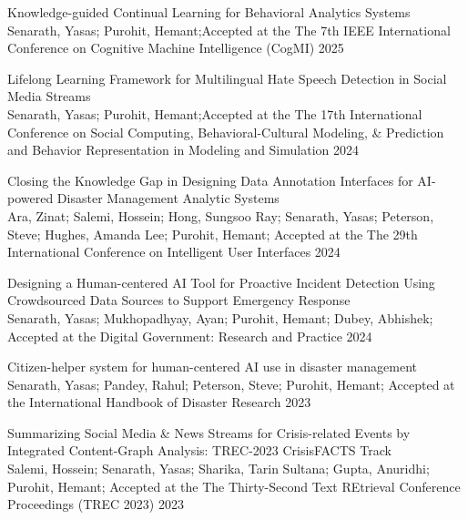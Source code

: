 \begin{rSubsection}{ Knowledge-guided Continual Learning for Behavioral  Analytics Systems }{\\ Senarath, Yasas; Purohit, Hemant;}{Accepted at the The 7th IEEE International Conference on Cognitive Machine Intelligence (CogMI)}{ 2025 }
\end{rSubsection}

\begin{rSubsection}{ Lifelong Learning Framework for Multilingual Hate Speech Detection in Social Media Streams }{\\ Senarath, Yasas; Purohit, Hemant;}{Accepted at the The 17th International Conference on Social Computing, Behavioral-Cultural Modeling, & Prediction and Behavior Representation in Modeling and Simulation}{ 2024 }
\end{rSubsection}

\begin{rSubsection}{ Closing the Knowledge Gap in Designing Data Annotation Interfaces for AI-powered Disaster Management Analytic Systems }{\\ Ara, Zinat; Salemi, Hossein; Hong, Sungsoo Ray; Senarath, Yasas; Peterson, Steve; Hughes, Amanda Lee; Purohit, Hemant; }{Accepted at the The 29th International Conference on Intelligent User Interfaces}{ 2024 }
\end{rSubsection}

\begin{rSubsection}{ Designing a Human-centered AI Tool for Proactive Incident Detection Using Crowdsourced Data Sources to Support Emergency Response }{\\ Senarath, Yasas; Mukhopadhyay, Ayan; Purohit, Hemant; Dubey, Abhishek; }{Accepted at the Digital Government: Research and Practice}{ 2024 }
\end{rSubsection}

\begin{rSubsection}{ Citizen-helper system for human-centered AI use in disaster management }{\\ Senarath, Yasas; Pandey, Rahul; Peterson, Steve; Purohit, Hemant; }{Accepted at the International Handbook of Disaster Research}{ 2023 }
\end{rSubsection}

\begin{rSubsection}{ Summarizing Social Media & News Streams for Crisis-related Events by Integrated Content-Graph Analysis: TREC-2023 CrisisFACTS Track }{\\ Salemi, Hossein; Senarath, Yasas; Sharika, Tarin Sultana; Gupta, Anuridhi; Purohit, Hemant; }{Accepted at the The Thirty-Second Text REtrieval Conference Proceedings (TREC 2023)}{ 2023 }
\end{rSubsection}

